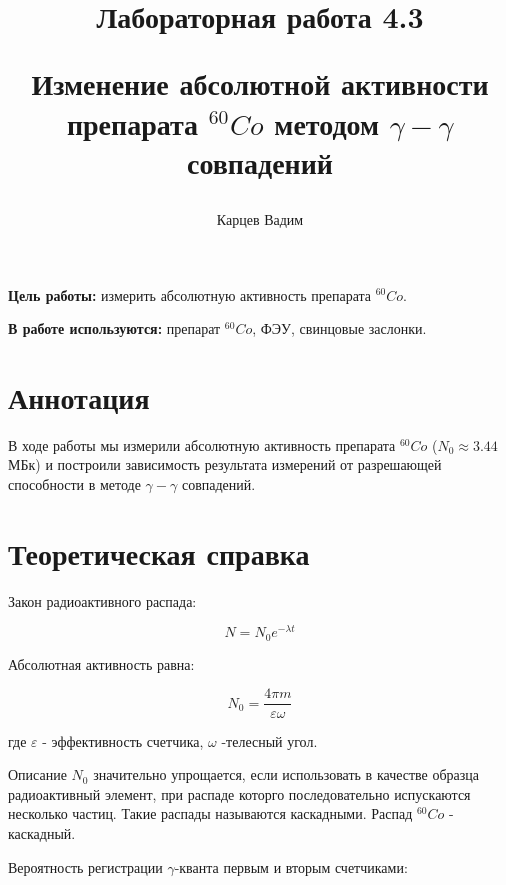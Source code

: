 \documentclass[12pt]{article}
\author{Карцев Вадим}
\title{Лабораторная работа 4.3

Изменение абсолютной активности препарата $^{60}Co$  методом $\gamma - \gamma$
совпадений}
\begin{document}
  \maketitle

  \textbf{Цель работы:} измерить абсолютную активность препарата $^{60}Co$.

  \textbf{В работе используются:} препарат $^{60}Co$, ФЭУ, свинцовые заслонки.

  \section{Аннотация}

    В ходе работы мы измерили абсолютную активность препарата $^{60}Co$
    ($N_0 \approx 3.44$ МБк) и построили зависимость результата измерений от
    разрешающей способности в методе $\gamma - \gamma$ совпадений.


  \newpage
  \section{Теоретическая справка}

    Закон радиоактивного распада:

    $$
      N=N_0e^{-\lambda t}
    $$

    Абсолютная активность равна:

    $$
      N_0=\frac{4\pi m}{\varepsilon \omega}
    $$

    где $\varepsilon$ - эффективность счетчика, $\omega$ -телесный угол.

    Описание $N_0$ значительно упрощается, если использовать в качестве образца
    радиоактивный элемент, при распаде которго последовательно испускаются
    несколько частиц. Такие распады называются каскадными. Распад $^{60}Co$ -
    каскадный.

    \begin{figure}[h!]
      \begin{minipage}[h]{\linewidth}
      \end{minipage}
      \label{pic:cobalt}
    \end{figure}

    Вероятность регистрации $\gamma$-кванта первым и вторым счетчиками:
\end{document}

